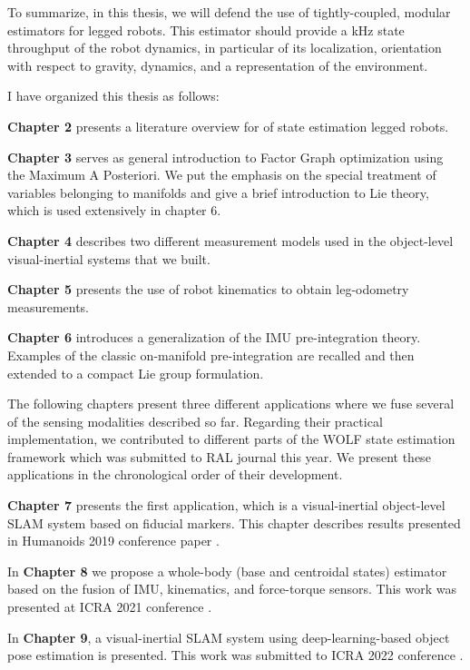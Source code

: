 To summarize, in this thesis, we will defend the use of tightly-coupled, modular estimators for legged robots. This estimator should provide a kHz state throughput of the robot dynamics, in particular of its localization, orientation with respect to gravity, dynamics, and a representation of the environment.

I have organized this thesis as follows:

\bigskip
\textbf{Chapter 2} presents a literature overview for of state estimation legged robots. 

\bigskip
\textbf{Chapter 3} serves as general introduction to Factor Graph optimization using the Maximum A Posteriori. We put the emphasis
on the special treatment of variables belonging to manifolds and give a brief introduction to Lie theory, which is used extensively in chapter 6.

\bigskip
\textbf{Chapter 4} describes two different measurement models used in the object-level visual-inertial systems that we built. 

\bigskip
\textbf{Chapter 5} presents the use of robot kinematics to obtain leg-odometry measurements. 

\bigskip
\textbf{Chapter 6} introduces a generalization of the IMU pre-integration theory. Examples of the classic on-manifold pre-integration are recalled and 
then extended to a compact Lie group formulation. 

\bigskip
The following chapters present three different applications where we fuse several of the sensing modalities described so far.
Regarding their practical implementation, we contributed to different parts of the WOLF state estimation framework \cite{sola2021wolf} which was submitted to RAL journal this year. We present these applications in the chronological order of their development.

\bigskip
\textbf{Chapter 7} presents the first application, which is a visual-inertial object-level SLAM system based on fiducial markers. This chapter describes
results presented in Humanoids 2019 conference paper \cite{fourmy2019absolute}.

\bigskip
In \textbf{Chapter 8} we propose a whole-body (base and centroidal states) estimator based on the fusion of IMU, kinematics, and force-torque sensors. This
work was presented at ICRA 2021 conference \cite{fourmy2021contact}.

\bigskip
In \textbf{Chapter 9}, a visual-inertial SLAM system using deep-learning-based object pose estimation is presented. This work was submitted to ICRA 2022 conference 
\cite{debeunne2021cosyslam}.





